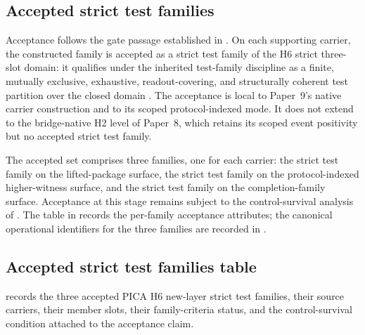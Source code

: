 \documentclass[11pt]{article}
\newcommand{\OldLayer}{H2}
\newcommand{\NewLayer}{H6}
\newcommand{\PaperNine}{Paper~9}
\newcommand{\PaperEight}{Paper~8}
\newcommand{\AcceptedTestCount}{three}
\theoremstyle{definition}
\begin{document}
\subsection{Accepted strict test families}\label{subsec:accepted-strict-test-families}

Acceptance follows the gate passage established in
.  On each supporting carrier, the constructed
family is accepted as a strict test family of the \NewLayer{} strict three-slot
domain: it qualifies under the inherited test-family discipline as a finite,
mutually exclusive, exhaustive, readout-covering, and structurally coherent test
partition over the closed domain \cite{Tsiokos2026CarrierToEvent}.  The
acceptance is local to \PaperNine{}'s native carrier construction and to its
scoped protocol-indexed mode.  It does not extend to the bridge-native
\OldLayer{} level of \PaperEight{}, which retains its scoped event positivity
but no accepted strict test family.

The accepted set comprises \AcceptedTestCount{} families, one for each carrier:
the strict test family on the lifted-package surface, the strict test family on
the protocol-indexed higher-witness surface, and the strict test family on the
completion-family surface.  Acceptance at this stage remains subject to the
control-survival analysis of .  The table in
 records the per-family
acceptance attributes; the canonical operational identifiers for the three
families are recorded in .

\subsection{Accepted strict test families table}\label{subsec:accepted-strict-test-families-table}

 records the three accepted PICA
\NewLayer{} new-layer strict test families, their source carriers, their member
slots, their family-criteria status, and the control-survival condition attached
to the acceptance claim.
\end{document}
